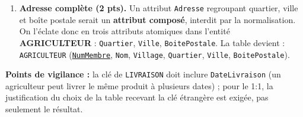 \documentclass[11pt]{article}
\begin{document}
\begin{corrige}
\begin{enumerate}
  \item \textbf{Adresse complète (2 pts).} Un attribut \texttt{Adresse} regroupant quartier, ville et boîte postale serait un \textbf{attribut composé}, interdit par la normalisation. On l'éclate donc en trois attributs atomiques dans l'entité \textbf{AGRICULTEUR} : \texttt{Quartier}, \texttt{Ville}, \texttt{BoitePostale}. La table devient : \texttt{AGRICULTEUR} (\underline{\texttt{NumMembre}}, \texttt{Nom}, \texttt{Village}, \texttt{Quartier}, \texttt{Ville}, \texttt{BoitePostale}).
\end{enumerate}
\textbf{Points de vigilance :} la clé de \texttt{LIVRAISON} doit inclure \texttt{DateLivraison} (un agriculteur peut livrer le même produit à plusieurs dates) ; pour le 1:1, la justification du choix de la table recevant la clé étrangère est exigée, pas seulement le résultat.
\end{corrige}
\end{document}

